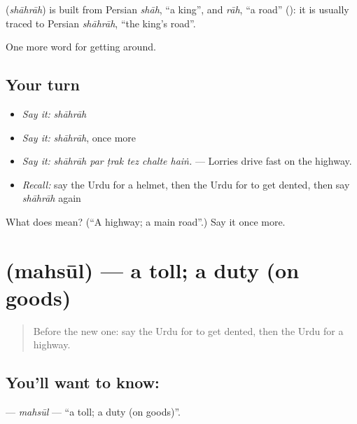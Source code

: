 \begin{cousinweb}
\textbf{} (\emph{shāhrāh}) is built from Persian \emph{shāh}, \textquotedblleft{}a king\textquotedblright{}, and \emph{rāh}, \textquotedblleft{}a road\textquotedblright{} (\textbf{}): it is usually traced to Persian \emph{shāhrāh}, \textquotedblleft{}the king's road\textquotedblright{}.
\end{cousinweb}

\begin{grammarlens}[title={What you've built}]
One more word for getting around.
\end{grammarlens}

\subsection*{Your turn}
\begin{itemize}
\raggedright
  \item \emph{Say it:} \emph{shāhrāh}
  \item \emph{Say it:} \emph{shāhrāh}, once more
  \item \emph{Say it:} \emph{shāhrāh par ṭrak tez chalte haiṅ.} — Lorries drive fast on the highway.
  \item \emph{Recall:} say the Urdu for a helmet, then the Urdu for to get dented, then say \emph{shāhrāh} again
\end{itemize}

\begin{tcolorbox}[breakable,colback=teal!4,colframe=teal!35!black,title={Before you move on}]
What does  mean? (\textquotedblleft{}A highway; a main road\textquotedblright{}.) Say it once more.
\end{tcolorbox}
\section[\texorpdfstring{\ur{محصول} (mahsūl)}{محصول (mahsūl)}]{ (mahsūl) — a toll; a duty (on goods)}

\label{lesson:UR-C396-mahsul}



\begin{quote}
Before the new one: say the Urdu for to get dented, then the Urdu for a highway.
\end{quote}

\subsection*{You'll want to know: }
\textbf{} — \emph{mahsūl} — \textquotedblleft{}a toll; a duty (on goods)\textquotedblright{}.

